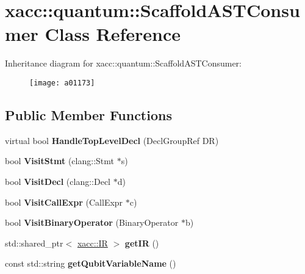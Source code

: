 \hypertarget{a01173}{}\section{xacc\+:\+:quantum\+:\+:Scaffold\+A\+S\+T\+Consumer Class Reference}
\label{a01173}
Inheritance diagram for xacc\+:\+:quantum\+:\+:Scaffold\+A\+S\+T\+Consumer\+:\begin{figure}[H]
\begin{center}
\leavevmode
\texttt{[image: a01173]}
\end{center}
\end{figure}
\subsection*{Public Member Functions}
\begin{DoxyCompactItemize}
\item 
\mbox{\label{a01173_ae846fd40684f3a1f820b8711e1204089}} 
virtual bool {\bfseries Handle\+Top\+Level\+Decl} (Decl\+Group\+Ref DR)
\item 
\mbox{\label{a01173_a6693c27f68332d8142fbdcb405e3259b}} 
bool {\bfseries Visit\+Stmt} (clang\+::\+Stmt $\ast$s)
\item 
\mbox{\label{a01173_ae6a05fe567cd8ea15feb694dbb898c33}} 
bool {\bfseries Visit\+Decl} (clang\+::\+Decl $\ast$d)
\item 
\mbox{\label{a01173_a1478fc9e887b04d2ad2aa8347ef6bbcb}} 
bool {\bfseries Visit\+Call\+Expr} (Call\+Expr $\ast$c)
\item 
\mbox{\label{a01173_a3f2f070888678caf53e57041b4f5ddd6}} 
bool {\bfseries Visit\+Binary\+Operator} (Binary\+Operator $\ast$b)
\item 
\mbox{\label{a01173_af9dbfa7c52b8a7de99132257e154e29a}} 
std\+::shared\+\_\+ptr$<$ \hyperlink{a01677}{xacc\+::\+IR} $>$ {\bfseries get\+IR} ()
\item 
\mbox{\label{a01173_aa301f0bcae6fb5a1c17557ba08144cb4}} 
const std\+::string {\bfseries get\+Qubit\+Variable\+Name} ()
\end{DoxyCompactItemize}
